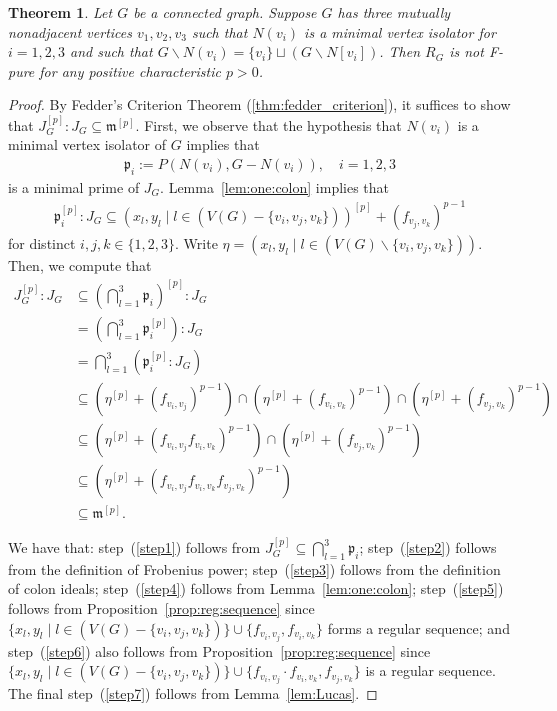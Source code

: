 \documentclass[12pt,a4paper]{amsart}
\theoremstyle{plain}
\newtheorem{thrm}{Theorem}[section]
\def\bthm{\begin{thrm}}
\def\ethm{\end{thrm}}
\theoremstyle{definition}
\theoremstyle{remark}
\let\setminus=\smallsetminus
\def\p{\mathfrak{p}}
\def\m{\mathfrak{m}}
\begin{document}
\bthm
\label{thm:non_F_purity}
Let $G$ be a connected graph.  Suppose $G$ has three mutually nonadjacent vertices $v_1,v_2,v_3$ such that $N(v_i)$ is a minimal vertex isolator for $i = 1,2,3$ and such that $G \setminus N(v_{i}) = \{v_{i}\} \sqcup (G\setminus N[v_i])$. Then $R_G$ is not F-pure for any positive characteristic $p > 0$.
\ethm

\begin{proof}
By Fedder's Criterion Theorem (\ref{thm:fedder_criterion}), it suffices to show that $J_G^{[p]}:J_G \subseteq \m^{[p]}$.  First, we observe that the hypothesis that $N(v_{i})$ is a minimal vertex isolator of $G$ implies that
\begin{align*}
    \p_i := P(N(v_i),G-N(v_i)), \quad i = 1,2,3
\end{align*}
is a minimal prime of $J_{G}$. Lemma~\ref{lem:one:colon} implies that 
\begin{align*}
\p_i^{[p]}:J_G \subseteq (x_l,y_l \mid l \in (V(G) - \{v_i,v_j,v_k\}))^{[p]} + (f_{v_j,v_k})^{p-1}
\end{align*}
for distinct $i,j,k \in \{1,2,3\}$.  Write $\eta = (x_l,y_l \mid l \in (V(G) \setminus \{v_i,v_j,v_k\}))$. Then, we compute that
\begin{align}
    J_G^{[p]}:J_G &\subseteq \left(\bigcap_{l = 1}^3 \p_i\right)^{[p]}:J_G \label{step1}\\
    &= \left(\bigcap_{l = 1}^3 \p_i^{[p]}\right):J_G\label{step2}\\
    &= \bigcap_{l = 1}^3 \left( \p_i^{[p]}:J_G\right)\label{step3}\\
    &\subseteq ( \eta^{[p]} + (f_{v_i,v_j})^{p-1}) \cap ( \eta^{[p]} + (f_{v_i,v_k})^{p-1}) \cap ( \eta^{[p]} + (f_{v_j,v_k})^{p-1})\label{step4}\\
    &\subseteq ( \eta^{[p]} + (f_{v_i,v_j}f_{v_i,v_k})^{p-1})  \cap ( \eta^{[p]} + (f_{v_j,v_k})^{p-1})\label{step5}\\
    &\subseteq ( \eta^{[p]} + (f_{v_i,v_j}f_{v_i,v_k}f_{v_j,v_k})^{p-1})\label{step6}\\
    &\subseteq \m^{[p]}\label{step7}.
    \end{align}

We have that: step~(\ref{step1}) follows from $J_G^{[p]} \subseteq \bigcap_{l = 1}^3 \p_i$; step~(\ref{step2}) follows from the definition of Frobenius power; step~(\ref{step3}) follows from the definition of colon ideals; step~(\ref{step4}) follows from Lemma~\ref{lem:one:colon}; step~(\ref{step5}) follows from Proposition~\ref{prop:reg:sequence} since $\{x_l,y_l \mid l \in (V(G) - \{v_i,v_j,v_k\})\} \cup \{f_{v_i,v_j},f_{v_i,v_k}\}$ forms a regular sequence; and step~(\ref{step6}) also follows from Proposition~\ref{prop:reg:sequence} since $\{x_l,y_l \mid l \in (V(G) - \{v_i,v_j,v_k\})\} \cup \{f_{v_i,v_j} \cdot f_{v_i,v_k},f_{v_j,v_k}\}$ is a regular sequence.  The final step~(\ref{step7}) follows from Lemma~\ref{lem:Lucas}.
\end{proof}
\end{document}
